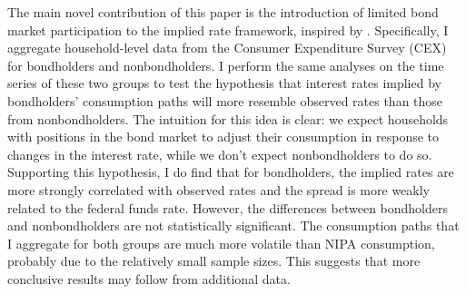 The main novel contribution of this paper is the introduction of limited bond market participation to the implied rate framework, inspired by \cite{vissing02}. Specifically, I aggregate household-level data from the Consumer Expenditure Survey (CEX) for bondholders and nonbondholders. I perform the same analyses on the time series of these two groups to test the hypothesis that interest rates implied by bondholders' consumption paths will more resemble observed rates than those from nonbondholders. The intuition for this idea is clear: we expect households with positions in the bond market to adjust their consumption in response to changes in the interest rate, while we don't expect nonbondholders to do so. Supporting this hypothesis, I do find that for bondholders, the implied rates are more strongly correlated with observed rates and the spread is more weakly related to the federal funds rate. However, the differences between bondholders and nonbondholders are not statistically significant. The consumption paths that I aggregate for both groups are much more volatile than NIPA consumption, probably due to the relatively small sample sizes. This suggests that more conclusive results may follow from additional data.